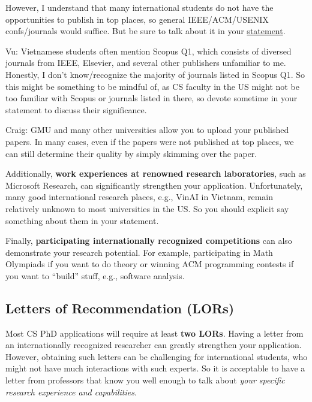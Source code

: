 \documentclass[10pt]{article}
\begin{document}
However, I understand that many international students do not have the opportunities to publish in top places, so general IEEE/ACM/USENIX confs/journals would suffice.  But be sure to talk about it in your \hyperref[sec:research-statement]{statement}.

\begin{tcolorbox}[left=1pt,right=1pt,top=1pt,bottom=1pt]
Vu: Vietnamese students often mention Scopus Q1, which consists of diversed journals from IEEE, Elsevier, and several other publishers unfamiliar to me.  Honestly, I don't know/recognize the majority of journals listed in Scopus Q1. So this might be something to be mindful of, as CS faculty in the US might not be too familiar with Scopus or journals listed in there, so devote sometime in your statement to discuss their significance.
\end{tcolorbox}

\begin{tcolorbox}[left=1pt,right=1pt,top=1pt,bottom=1pt]
Craig: GMU and many other universities allow you to upload your published papers. In many cases, even if the papers were not published at top places, we can still determine their quality by simply skimming over the paper.  
\end{tcolorbox}

Additionally, \textbf{work experiences at renowned research laboratories}, such as Microsoft Research, can significantly strengthen your
application.  Unfortunately, many good international research places, e.g., VinAI in Vietnam, remain relatively unknown to most universities in the US. So you should explicit say something about them in your statement.

Finally, \textbf{participating internationally recognized competitions} can also demonstrate your research potential.
For example, participating in Math Olympiads if you want to do theory or  winning ACM programming contests if you want to ``build'' stuff, e.g., software analysis.


\subsection{Letters of Recommendation (LORs)}

Most CS PhD applications will require at least \textbf{two LORs}. Having a letter from an internationally recognized researcher can greatly strengthen your application. However, obtaining such letters
can be challenging for international students, who might not have much interactions with such experts. So it is acceptable to have a letter from professors that know you well enough to talk about \emph{your specific research experience and capabilities}.
\end{document}
